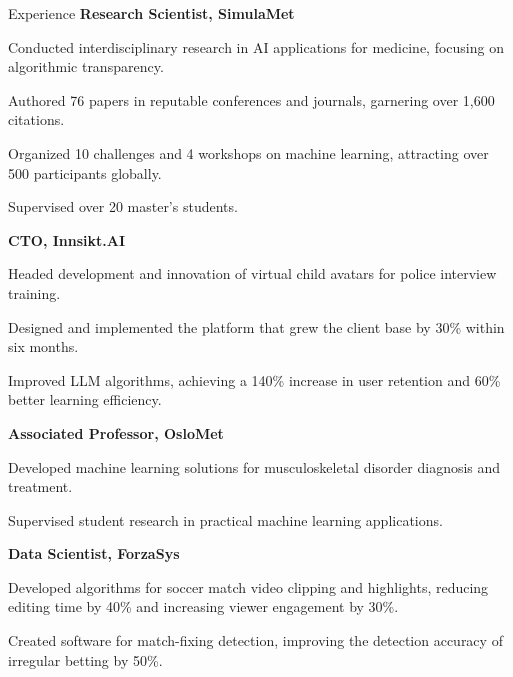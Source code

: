 \begin{rubric}{Experience}
%
\entry*[2021 -- present]%
\textbf{Research Scientist, SimulaMet} \par
\begin{compactitem}
\item Conducted interdisciplinary research in AI applications for medicine, focusing on algorithmic transparency.
\item Authored 76 papers in reputable conferences and journals, garnering over 1,600 citations.
\item Organized 10 challenges and 4 workshops on machine learning, attracting over 500 participants globally.
\item Supervised over 20 master's students.
\vspace{-12pt}
\end{compactitem}
%
\entry*[2023 -- present]%
\textbf{CTO, Innsikt.AI} \par
\begin{compactitem}
    \item Headed development and innovation of virtual child avatars for police interview training.
    \item Designed and implemented the platform that grew the client base by 30\% within six months.
    \item Improved LLM algorithms, achieving a 140\% increase in user retention and 60\% better learning efficiency.
    \vspace{-12pt}
\end{compactitem}
%
\entry*[2023 -- present]%
\textbf{Associated Professor, OsloMet} \par
\begin{compactitem}
    \item Developed machine learning solutions for musculoskeletal disorder diagnosis and treatment.
    \item Supervised student research in practical machine learning applications.
    \vspace{-12pt}
\end{compactitem}
%
\entry*[2022 -- 2023]%
\textbf{Data Scientist, ForzaSys} \par
\begin{compactitem}
    \item Developed algorithms for soccer match video clipping and highlights, reducing editing time by 40\% and increasing viewer engagement by 30\%.
    \item Created software for match-fixing detection, improving the detection accuracy of irregular betting by 50\%.
    \vspace{-12pt}
\end{compactitem}


\end{rubric}
